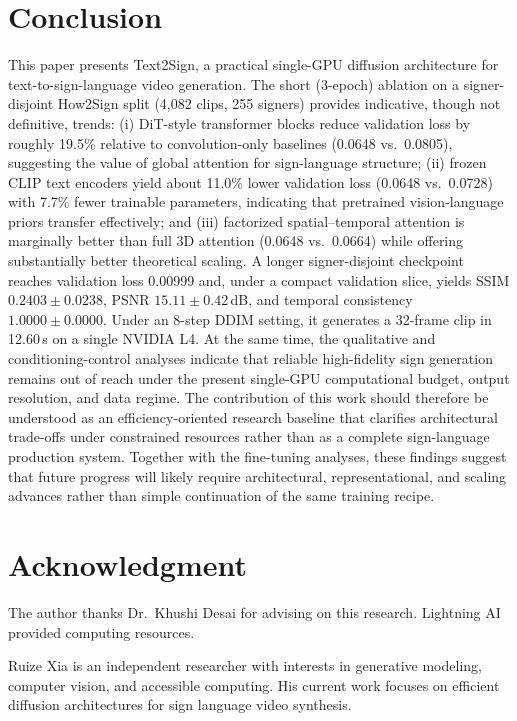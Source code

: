 \documentclass{ieeeaccess}
\begin{document}
\section{Conclusion}
\label{sec:conclusion}
{\color{blue}%

This paper presents Text2Sign, a practical single-GPU diffusion architecture for text-to-sign-language video generation. The short (3-epoch) ablation on a signer-disjoint How2Sign split (4,082 clips, 255 signers) provides indicative, though not definitive, trends: (i) DiT-style transformer blocks reduce validation loss by roughly 19.5\% relative to convolution-only baselines (0.0648 vs.\ 0.0805), suggesting the value of global attention for sign-language structure; (ii) frozen CLIP text encoders yield about 11.0\% lower validation loss (0.0648 vs.\ 0.0728) with 7.7\% fewer trainable parameters, indicating that pretrained vision-language priors transfer effectively; and (iii) factorized spatial--temporal attention is marginally better than full 3D attention (0.0648 vs.\ 0.0664) while offering substantially better theoretical scaling. A longer signer-disjoint checkpoint reaches validation loss 0.00999 and, under a compact validation slice, yields SSIM $0.2403\pm0.0238$, PSNR $15.11\pm0.42$\,dB, and temporal consistency $1.0000\pm0.0000$. Under an 8-step DDIM setting, it generates a 32-frame clip in 12.60\,s on a single NVIDIA L4. At the same time, the qualitative and conditioning-control analyses indicate that reliable high-fidelity sign generation remains out of reach under the present single-GPU computational budget, output resolution, and data regime. The contribution of this work should therefore be understood as an efficiency-oriented research baseline that clarifies architectural trade-offs under constrained resources rather than as a complete sign-language production system. Together with the fine-tuning analyses, these findings suggest that future progress will likely require architectural, representational, and scaling advances rather than simple continuation of the same training recipe.

}
\section*{Acknowledgment}
{\color{blue}%
The author thanks Dr.\ Khushi Desai for advising on this research. Lightning AI provided computing resources.
}




{\color{blue}%
\begin{IEEEbiographynophoto}{Ruize Xia}
is an independent researcher with interests in generative modeling, computer vision, and accessible computing. His current work focuses on efficient diffusion architectures for sign language video synthesis.
\end{IEEEbiographynophoto}
}

\EOD
\end{document}
